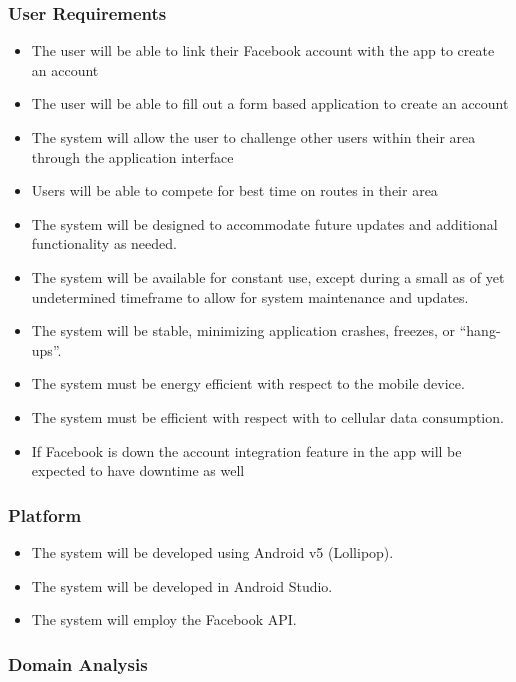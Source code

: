 ﻿\documentclass{article}
\begin{document}
\subsubsection{User Requirements}
\begin{itemize}
    \item The user will be able to link their Facebook account with the app to create an account
    \item The user will be able to fill out a form based application to create an account
    \item The system will allow the user to challenge other users within their area through the application interface
    \item Users will be able to compete for best time on routes in their area
    \item The system will be designed to accommodate future updates and additional functionality as needed.
    \item The system will be available for constant use, except during a small as of yet undetermined timeframe to allow for system maintenance and updates.
    \item The system will be stable, minimizing application crashes, freezes, or “hang-ups”.
    \item The system must be energy efficient with respect to the mobile device.
    \item The system must be efficient with respect with to cellular data consumption.
    \item If Facebook is down the account integration feature in the app will be expected to have downtime as well

\end{itemize}

\subsubsection{Platform}
\begin{itemize}
    \item The system will be developed using Android v5 (Lollipop).
    \item The system will be developed in Android Studio.
    \item The system will employ the Facebook API.
\end{itemize}

\subsubsection{Domain Analysis}
\end{document}
